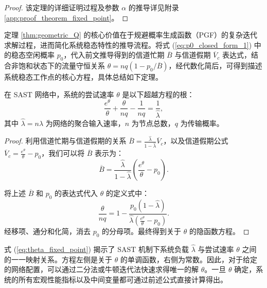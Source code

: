 \begin{proof}
该定理的详细证明过程及参数 $\alpha$ 的推导详见附录\ref{app:proof_theorem_fixed_point}。
\end{proof}

定理 \ref{thm:geometric_Q} 的核心价值在于规避概率生成函数（PGF）的复杂迭代求解过程，进而简化系统稳态特性的推导流程。将式 (\ref{eq:p0_closed_form_1}) 中的稳态空闲概率 $p_0$，代入前文推导得到的信道忙期 $\overline{B}$ 与信道假期 $\overline{V}_c$ 表达式，结合非饱和状态下的流量守恒关系 $\theta = n q (1 - p_0/\overline{B})$，经代数化简后，可得到描述系统稳态工作点的核心方程，具体总结如下定理。
\begin{theorem}
	\label{thm:fixed_point_theta}
	在 SAST 网络中，系统的尝试速率 $\theta$ 是以下超越方程的根：
	\begin{equation}
		\label{eq:theta_fixed_point}
		\frac{e^{\theta}}{\theta} + \frac{\theta}{n q} - \frac{1}{n q} = \frac{1}{\hat{\lambda}},
	\end{equation}
	其中 $\hat{\lambda} = n\lambda$ 为网络的聚合输入速率，$n$ 为节点总数，$q$ 为传输概率。
\end{theorem}

\begin{proof}
利用信道忙期与信道假期的关系 $\overline{B} = \frac{\hat{\lambda}}{1 - \hat{\lambda}} \overline{V}_c$，以及信道假期公式 $\overline{V}_c = \frac{e^{\theta}}{\theta} - p_0$，我们可以将 $\overline{B}$ 表示为：
\begin{equation}
	\overline{B} = \frac{\hat{\lambda}}{1 - \hat{\lambda}} \left( \frac{e^{\theta}}{\theta} - p_0 \right).
\end{equation}

将上述 $\overline{B}$ 和 $p_0$ 的表达式代入 $\theta$ 的定义式中：
\begin{equation}
	\frac{\theta}{n q} = 1 - \frac{p_0 (1 - \hat{\lambda})}{\hat{\lambda} (\frac{e^{\theta}}{\theta} - p_0)}.
\end{equation}
经移项、通分和化简，消去 $p_0$ 的分母项。最终得到关于 $\theta$ 的隐函数方程。
\end{proof}
式 (\ref{eq:theta_fixed_point}) 揭示了 SAST 机制下系统负载 $\hat{\lambda}$ 与尝试速率 $\theta$ 之间的一一映射关系。方程左侧是关于 $\theta$ 的单调函数，右侧为常数。因此，对于给定的网络配置，可以通过二分法或牛顿迭代法快速求得唯一的解 $\theta$。一旦 $\theta$ 确定，系统的所有宏观性能指标以及中间变量都可通过前述公式直接计算得出。

